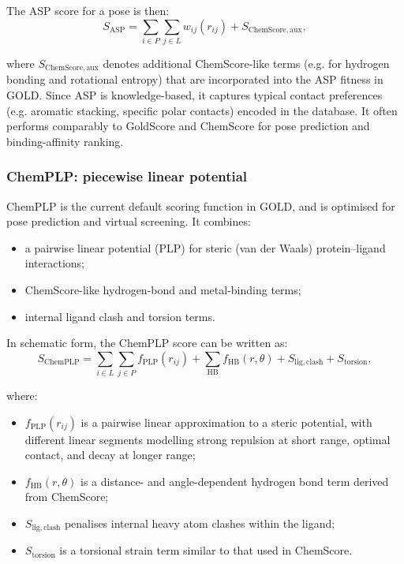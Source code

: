 \documentclass[12pt, a4paper]{article}
\begin{document}
The ASP score for a pose is then:
\begin{equation}
S_{\mathrm{ASP}}
=
\sum_{i \in P}\sum_{j \in L}
w_{ij}(r_{ij})
+
S_{\mathrm{ChemScore,aux}},
\end{equation}

where 
$S_{\mathrm{ChemScore,aux}}$ denotes additional ChemScore-like terms (e.g. for hydrogen bonding and rotational entropy) that are incorporated into the ASP fitness in GOLD. Since ASP is knowledge-based, it captures typical contact preferences (e.g. aromatic stacking, specific polar contacts) encoded in the database. It often performs comparably to GoldScore and ChemScore for pose prediction and binding-affinity ranking.\cite{CH7_Mooij2005}

\subsubsection{ChemPLP: piecewise linear potential}

ChemPLP is the current default scoring function in GOLD, and is optimised for pose prediction and virtual screening. 
It combines:
\begin{itemize}
    \item a pairwise linear potential (PLP) for steric (van der Waals) protein–ligand interactions;
    \item ChemScore-like hydrogen-bond and metal-binding terms;
    \item internal ligand clash and torsion terms.
\end{itemize}

In schematic form, the ChemPLP score can be written as:
\begin{equation}
S_{\mathrm{ChemPLP}}
=
\sum_{i \in L}\sum_{j \in P}
f_{\mathrm{PLP}}(r_{ij})
+
\sum_{\mathrm{HB}}
f_{\mathrm{HB}}(r,\theta)
+
S_{\mathrm{lig,clash}}
+
S_{\mathrm{torsion}},
\label{eq:ChemPLP}
\end{equation}

where:
\begin{itemize}
    \item $f_{\mathrm{PLP}}(r_{ij})$ is a pairwise linear approximation to a steric potential, with different linear segments modelling strong repulsion at short range, optimal contact, and decay at longer range;
    \item $f_{\mathrm{HB}}(r,\theta)$ is a distance- and angle-dependent hydrogen bond term derived from ChemScore;
    \item $S_{\mathrm{lig,clash}}$ penalises internal heavy atom clashes within the ligand;
    \item $S_{\mathrm{torsion}}$ is a torsional strain term similar to that used in ChemScore.
\end{itemize}
\end{document}
